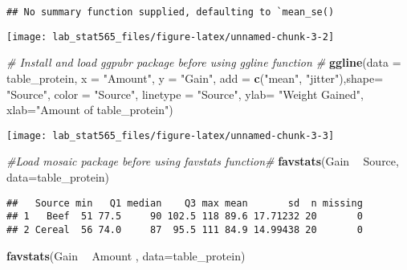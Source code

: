 \documentclass[]{article}
\newenvironment{Shaded}{\begin{snugshade}}{\end{snugshade}}
\newcommand{\CommentTok}[1]{\textcolor[rgb]{0.56,0.35,0.01}{\textit{#1}}}
\newcommand{\DataTypeTok}[1]{\textcolor[rgb]{0.13,0.29,0.53}{#1}}
\newcommand{\KeywordTok}[1]{\textcolor[rgb]{0.13,0.29,0.53}{\textbf{#1}}}
\newcommand{\NormalTok}[1]{#1}
\newcommand{\OperatorTok}[1]{\textcolor[rgb]{0.81,0.36,0.00}{\textbf{#1}}}
\newcommand{\StringTok}[1]{\textcolor[rgb]{0.31,0.60,0.02}{#1}}
\begin{document}
\begin{verbatim}
## No summary function supplied, defaulting to `mean_se()
\end{verbatim}

\texttt{[image: lab\_stat565\_files/figure-latex/unnamed-chunk-3-2]}

\begin{Shaded}
\begin{Highlighting}[]
\CommentTok{# Install and load ggpubr package before using ggline function # }
\KeywordTok{ggline}\NormalTok{(}\DataTypeTok{data =}\NormalTok{ table_protein, }\DataTypeTok{x =} \StringTok{"Amount"}\NormalTok{, }\DataTypeTok{y =} \StringTok{"Gain"}\NormalTok{, }\DataTypeTok{add =} \KeywordTok{c}\NormalTok{(}\StringTok{"mean"}\NormalTok{, }\StringTok{"jitter"}\NormalTok{),}\DataTypeTok{shape=} \StringTok{"Source"}\NormalTok{,  }\DataTypeTok{color =} \StringTok{"Source"}\NormalTok{, }\DataTypeTok{linetype =} \StringTok{"Source"}\NormalTok{, }\DataTypeTok{ylab=} \StringTok{"Weight Gained"}\NormalTok{, }\DataTypeTok{xlab=}\StringTok{"Amount of table_protein"}\NormalTok{)}
\end{Highlighting}
\end{Shaded}

\texttt{[image: lab\_stat565\_files/figure-latex/unnamed-chunk-3-3]}

\begin{Shaded}
\begin{Highlighting}[]
\CommentTok{#Load mosaic package before using favstats function#}
\KeywordTok{favstats}\NormalTok{(Gain }\OperatorTok{~}\StringTok{ }\NormalTok{Source, }\DataTypeTok{data=}\NormalTok{table_protein)}
\end{Highlighting}
\end{Shaded}

\begin{verbatim}
##   Source min   Q1 median    Q3 max mean       sd  n missing
## 1   Beef  51 77.5     90 102.5 118 89.6 17.71232 20       0
## 2 Cereal  56 74.0     87  95.5 111 84.9 14.99438 20       0
\end{verbatim}

\begin{Shaded}
\begin{Highlighting}[]
\KeywordTok{favstats}\NormalTok{(Gain }\OperatorTok{~}\StringTok{ }\NormalTok{Amount , }\DataTypeTok{data=}\NormalTok{table_protein)}
\end{Highlighting}
\end{Shaded}
\end{document}
